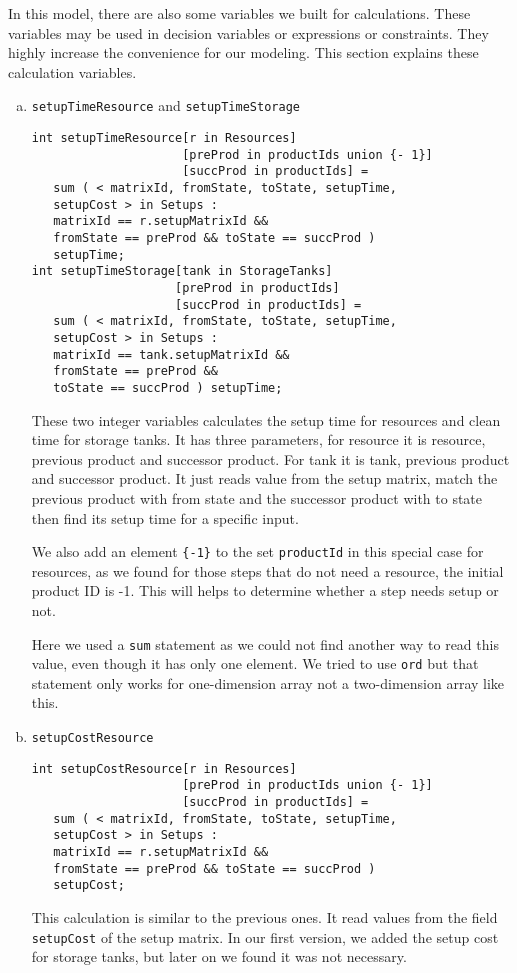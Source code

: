 \documentclass[a4paper, 12pt]{article}
\begin{document}
In this model, there are also some variables we built for calculations. These variables may be used in decision variables or expressions or constraints. They highly increase the convenience for our modeling. This section explains these calculation variables. 
\begin{enumerate}[a.~]
\item \texttt{setupTimeResource} and \texttt{setupTimeStorage}
\begin{lstlisting}
int setupTimeResource[r in Resources]
                     [preProd in productIds union {- 1}]
                     [succProd in productIds] = 
   sum ( < matrixId, fromState, toState, setupTime,
   setupCost > in Setups :
   matrixId == r.setupMatrixId && 
   fromState == preProd && toState == succProd )
   setupTime;
int setupTimeStorage[tank in StorageTanks]
                    [preProd in productIds]
                    [succProd in productIds] = 
   sum ( < matrixId, fromState, toState, setupTime,
   setupCost > in Setups :
   matrixId == tank.setupMatrixId && 
   fromState == preProd && 
   toState == succProd ) setupTime;
\end{lstlisting}
These two integer variables calculates the setup time for resources and clean time for storage tanks. It has three parameters, for resource it is resource, previous product and successor product. For tank it is tank, previous product and successor product. It just reads value from the setup matrix, match the previous product with from state and the successor product with to state then find its setup time for a specific input. 

We also add an element \texttt{\{-1\}} to the set \texttt{productId} in this special case for resources, as we found for those steps that do not need a resource, the initial product ID is -1. This will helps to determine whether a step needs setup or not. 

Here we used a \texttt{sum} statement as we could not find another way to read this value, even though it has only one element. We tried to use \texttt{ord} but that statement only works for one-dimension array not a two-dimension array like this. 
\item \texttt{setupCostResource}
\begin{lstlisting}
int setupCostResource[r in Resources]
                     [preProd in productIds union {- 1}]
                     [succProd in productIds] = 
   sum ( < matrixId, fromState, toState, setupTime,
   setupCost > in Setups :
   matrixId == r.setupMatrixId && 
   fromState == preProd && toState == succProd )
   setupCost;
\end{lstlisting}
This calculation is similar to the previous ones. It read values from the field \texttt{setupCost} of the setup matrix. In our first version, we added the setup cost for storage tanks, but later on we found it was not necessary. 
\end{enumerate}
\end{document}
